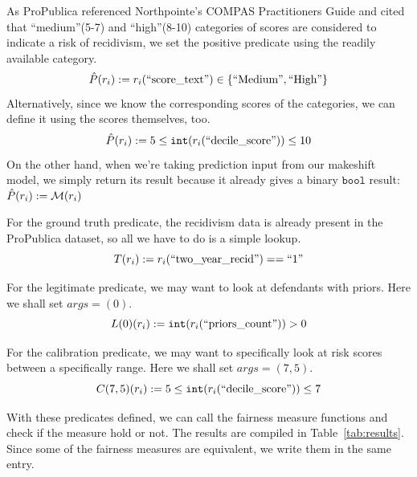 \documentclass[conference]{IEEEtran}
\begin{document}
As ProPublica referenced Northpointe's COMPAS Practitioners Guide and cited that ``medium''(5-7) and ``high''(8-10) categories of scores are considered to indicate a risk of recidivism, we set the positive predicate using the readily available category.
\[
    \hat{P}(r_i) := r_i(\text{``score\_text''}) \in \{\text{``Medium''},\text{``High''}\}
\]
Alternatively, since we know the corresponding scores of the categories, we can define it using the scores themselves, too.
\[
    \hat{P}(r_i) := 5 \leq \mathtt{int}(r_i(\text{``decile\_score''})) \leq 10
\]
On the other hand, when we're taking prediction input from our makeshift model, we simply return its result because it already gives a binary $\mathtt{bool}$ result: $\hat{P}(r_i) := \mathcal{M}(r_i)$

For the ground truth predicate, the recidivism data is already present in the ProPublica dataset, so all we have to do is a simple lookup.
\[
    T(r_i) := r_i(\text{``two\_year\_recid''}) == \text{``1''}
\]

For the legitimate predicate, we may want to look at defendants with priors. Here we shall set $args = (0)$.
\[
    L(0)(r_i) := \mathtt{int}(r_i(\text{``priors\_count''})) > 0
\]

For the calibration predicate, we may want to specifically look at risk scores between a specifically range. Here we shall set $args = (7,5)$.
\[
    C(7,5)(r_i) := 5 \leq \mathtt{int}(r_i(\text{``decile\_score''})) \leq 7
\]

With these predicates defined, we can call the fairness measure functions and check if the measure hold or not. The results are compiled in Table~\ref{tab:results}. Since some of the fairness measures are equivalent, we write them in the same entry.
\end{document}
